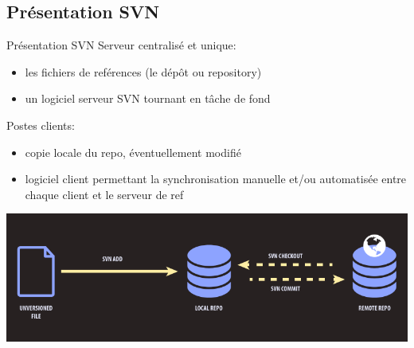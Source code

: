 \subsection{Présentation SVN}
\begin{frame}{Présentation SVN}
  Serveur centralisé et unique:
  \begin{itemize}
      \item{les fichiers de reférences (le dépôt ou repository)}
      \item{un logiciel serveur SVN tournant en tâche de fond}
  \end{itemize}

  Postes clients:
  \begin{itemize}
      \item{copie locale du repo, éventuellement modifié}
      \item{logiciel client permettant la synchronisation manuelle et/ou
            automatisée entre chaque client et le serveur de ref}
  \end{itemize}
  \includegraphics[width=\textwidth]{./svn1.png}
\end{frame}

